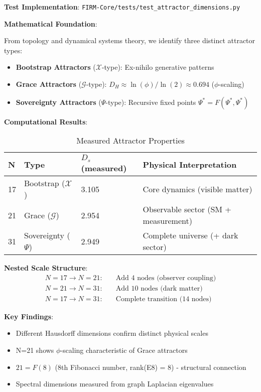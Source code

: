 \documentclass[12pt,a4paper]{article}
\begin{document}
\textbf{Test Implementation}: \texttt{FIRM-Core/tests/test\_attractor\_dimensions.py}

\textbf{Mathematical Foundation}:

From topology and dynamical systems theory, we identify three distinct attractor types:

\begin{itemize}
\item \textbf{Bootstrap Attractors} ($\mathcal{X}$-type): Ex-nihilo generative patterns
\item \textbf{Grace Attractors} ($\mathcal{G}$-type): $D_H \approx \ln(\phi)/\ln(2) \approx 0.694$ ($\phi$-scaling)
\item \textbf{Sovereignty Attractors} ($\Psi$-type): Recursive fixed points $\Psi^* = F(\Psi^*, \Psi^*)$
\end{itemize}

\textbf{Computational Results}:
\begin{table}[H]
\centering
\caption{Measured Attractor Properties}
\begin{tabular}{@{}llll@{}}
\toprule
N & Type & $D_s$ (measured) & Physical Interpretation \\
\midrule
17 & Bootstrap ($\mathcal{X}$) & 3.105 & Core dynamics (visible matter) \\
21 & Grace ($\mathcal{G}$) & 2.954 & Observable sector (SM + measurement) \\
31 & Sovereignty ($\Psi$) & 2.949 & Complete universe (+ dark sector) \\
\bottomrule
\end{tabular}
\end{table}

\textbf{Nested Scale Structure}:
\begin{align}
N=17 \rightarrow N=21: &\quad \text{Add 4 nodes (observer coupling)} \\
N=21 \rightarrow N=31: &\quad \text{Add 10 nodes (dark matter)} \\
N=17 \rightarrow N=31: &\quad \text{Complete transition (14 nodes)}
\end{align}

\textbf{Key Findings}:
\begin{itemize}
\item Different Hausdorff dimensions confirm distinct physical scales
\item N=21 shows $\phi$-scaling characteristic of Grace attractors
\item $21 = F(8)$ (8th Fibonacci number, rank(E8) = 8) - structural connection
\item Spectral dimensions measured from graph Laplacian eigenvalues
\end{itemize}
\end{document}
